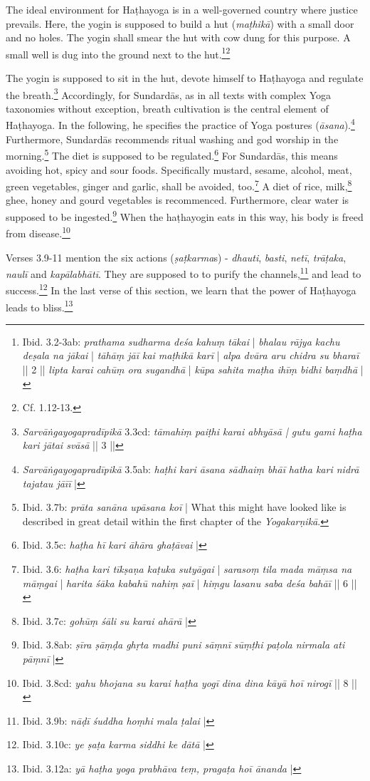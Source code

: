 The ideal environment for Haṭhayoga is in a well-governed country where justice prevails. Here, the yogin is supposed to build a hut (\textit{maṭhikā}) with a small door and no holes. The yogin shall smear the hut with cow dung for this purpose. A small well is dug into the ground next to the hut.\footnote{Ibid. 3.2-3ab: \textit{prathama sudharma deśa kahuṃ tākai} | \textit{bhalau rājya kachu deṣala na jākai} | \textit{tāhāṃ jāī kai maṭhikā karī} | \textit{alpa dvāra aru chidra su bharaī} || 2 || \textit{lipta karai cahūṃ ora sugandhā} | \textit{kūpa sahita maṭha ihīṃ bidhi baṃdhā} |}\footnote{Cf.  1.12-13.}

The yogin is supposed to sit in the hut, devote himself to Haṭhayoga and regulate the breath.\footnote{\textit{Sarvāṅgayogapradīpikā} 3.3cd: \textit{tāmahiṃ paiṭhi karai abhyāsā | gutu gami haṭha kari jātai svāsā} || 3 ||} Accordingly, for Sundardās, as in all texts with complex Yoga taxonomies without exception, breath cultivation is the central element of Haṭhayoga. In the following, he specifies the practice of Yoga postures (\textit{āsana}).\footnote{\textit{Sarvāṅgayogapradīpikā} 3.5ab: \textit{haṭhi kari āsana sādhaiṃ bhāī} \textit{hatha kari nidrā tajatau jāīī} |} Furthermore, Sundardās recommends ritual washing and god worship in the morning.\footnote{Ibid. 3.7b: \textit{prāta sanāna upāsana koī} | What this might have looked like is described in great detail within the first chapter of the \textit{Yogakarṇikā}.} The diet is supposed to be regulated.\footnote{Ibid. 3.5c: \textit{haṭha hī kari āhāra ghaṭāvai} |} For Sundardās, this means avoiding hot, spicy and sour foods. Specifically mustard, sesame, alcohol, meat, green vegetables, ginger and garlic, shall be avoided, too.\footnote{Ibid. 3.6: \textit{haṭha kari tīkṣaṇa kaṭuka sutyāgai} | \textit{sarasoṃ tila mada māṃsa na māṃgai} | \textit{harita śāka kabahū nahiṃ ṣaī} | \textit{hiṃgu lasanu saba deśa bahāī} || 6 ||} A diet of rice, milk,\footnote{Ibid. 3.7c: \textit{gohūṃ śāli su karai ahārā} |} ghee, honey and gourd vegetables is recommenced. Furthermore, clear water is supposed to be ingested.\footnote{Ibid. 3.8ab: \textit{ṣīra ṣāṃḍa ghṛta madhi puni sāṃnī} \textit{sūṃṭhi paṭola nirmala ati pāṃnī} |} When the haṭhayogin eats in this way, his body is freed from disease.\footnote{Ibid. 3.8cd: \textit{yahu bhojana su karai haṭha yogī} \textit{dina dina kāyā hoī nirogī} || 8 ||}

Verses 3.9-11 mention the six actions (\textit{ṣaṭkarma}s) - \textit{dhauti}, \textit{basti}, \textit{netī}, \textit{trāṭaka}, \textit{naulī} and \textit{kapālabhātī}. They are supposed to to purify the channels,\footnote{Ibid. 3.9b: \textit{nāḍī śuddha hoṃhi mala ṭalai} |} and lead to success.\footnote{Ibid. 3.10c: \textit{ye ṣaṭa karma siddhi ke dātā} |} In the last verse of this section, we learn that the power of Haṭhayoga leads to bliss.\footnote{Ibid. 3.12a: \textit{yā haṭha yoga prabhāva teṃ, pragaṭa hoī ānanda} |}

